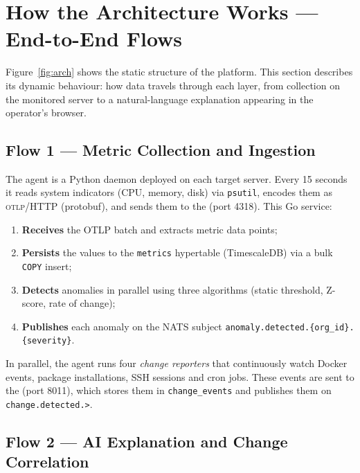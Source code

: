 \section{How the Architecture Works — End-to-End Flows}

Figure~\ref{fig:arch} shows the static structure of the platform. This section
describes its dynamic behaviour: how data travels through each layer, from
collection on the monitored server to a natural-language explanation appearing
in the operator's browser.

\subsection{Flow 1 — Metric Collection and Ingestion}

The \caimp{} agent is a Python daemon deployed on each target server. Every
15 seconds it reads system indicators (CPU, memory, disk) via \texttt{psutil},
encodes them as \textsc{otlp}/HTTP (protobuf), and sends them to the
 (port 4318). This Go service:

\begin{enumerate}
  \item \textbf{Receives} the OTLP batch and extracts metric data points;
  \item \textbf{Persists} the values to the \texttt{metrics} hypertable
        (TimescaleDB) via a bulk \texttt{COPY} insert;
  \item \textbf{Detects} anomalies in parallel using three algorithms
        (static threshold, Z-score, rate of change);
  \item \textbf{Publishes} each anomaly on the NATS subject
        \texttt{anomaly.detected.\{org\_id\}.\{severity\}}.
\end{enumerate}

In parallel, the agent runs four \textit{change reporters} that continuously
watch Docker events, package installations, SSH sessions and cron jobs. These
events are sent to the  (port 8011), which stores
them in \texttt{change\_events} and publishes them on \texttt{change.detected.>}.

\subsection{Flow 2 — AI Explanation and Change Correlation}

